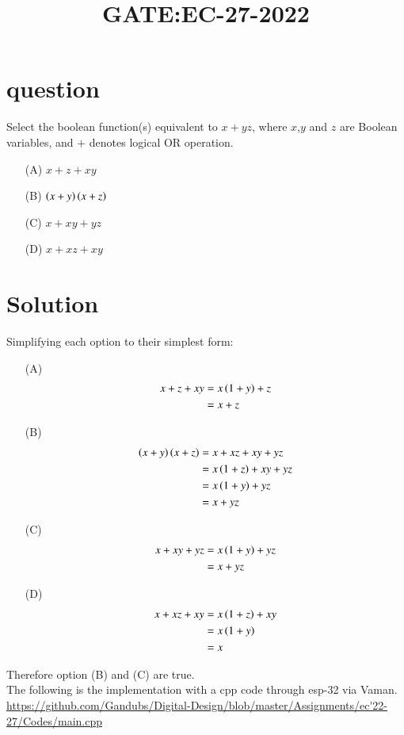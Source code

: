 \documentclass[journal,12pt,onecolumn]{IEEEtran}
\theoremstyle{remark}
\begin{document}

\vspace{3cm}

\title{GATE:EC-27-2022}
\maketitle
\bigskip



\section{question}
Select the boolean function(s) equivalent to $x+yz$, where $x$,$y$ and $z$ are Boolean variables, and $+$ denotes logical OR operation.
\begin{enumerate}
    \item [(A)] $x+z+xy$
    \item [(B)] $\left(x+y\right)\left(x+z\right)$
    \item [(C)] $x+xy+yz$
    \item [(D)] $x+xz+xy$
\end{enumerate}

\section{Solution}
Simplifying each option to their simplest form:
\begin{enumerate}
    \item [(A)]
    \begin{align}
        x+z+xy &= x\left(1+y\right) +z\\
        &=x+z
    \end{align}
    \item [(B)]
    \begin{align}
    \left(x+y\right)\left(x+z\right) &= x+xz+xy+yz\\
    &=x\left(1+z\right)+xy+yz\\
    &=x\left(1+y\right)+yz\\
    &=x+yz
        \end{align}
    \item [(C)]
    \begin{align}
        x+xy+yz &= x\left(1+y\right)+yz\\
        &=x+yz
    \end{align}
    \item [(D)]
    \begin{align}
        x+xz+xy &= x\left(1+z\right)+xy\\
        &=x\left(1+y\right)\\
        &=x
    \end{align}
\end{enumerate}
Therefore option (B) and (C) are true.\\
The following is the implementation with a cpp code through esp-32 via Vaman.\\
\url{https://github.com/Gandubs/Digital-Design/blob/master/Assignments/ec'22-27/Codes/main.cpp}
 
\end{document}
